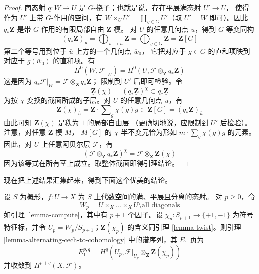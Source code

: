 \begin{proof}
商态射 $q : W \to U$ 是 $G$-挠子；也就是说，存在平展满态射 $U' \to U$，
使得作为 $U'$ 上带 $G$-作用的空间，有
$W \times_U U' = \coprod_{g \in G} U'$（取 $U' = W$ 即可）。因此
$q_*\underline{\mathbf{Z}}$ 是带 $G$-作用的有限局部自由 $\mathbf{Z}$-模。
对 $U$ 的任意几何点 $\overline{u}$，得到 $G$-等变同构
$$
(q_*\underline{\mathbf{Z}})_{\overline{u}}
= \bigoplus\nolimits_{\overline{w} \mapsto \overline{u}} \mathbf{Z}
= \bigoplus\nolimits_{g \in G} \mathbf{Z} = \mathbf{Z}[G]
$$
第二个等号用到位于 $\overline{u}$ 上方的一个几何点 $\overline{w}_0$，
它把对应于 $g \in G$ 的直和项映到对应于 $g(\overline{w}_0)$ 的直和项。有
$$
H^0(W, \mathcal{F}|_W) =
H^0(U, \mathcal{F} \otimes_\mathbf{Z} q_*\underline{\mathbf{Z}})
$$
这是因为
$q_*\mathcal{F}|_W = \mathcal{F} \otimes_\mathbf{Z} q_*\underline{\mathbf{Z}}$；
限制到 $U'$ 后即可检验。令
$$
\underline{\mathbf{Z}}(\chi) =
(q_*\underline{\mathbf{Z}})^\chi \subset
q_*\underline{\mathbf{Z}}
$$
为按 $\chi$ 变换的截面所成的子层。对 $U$ 的任意几何点 $\overline{u}$，有
$$
\underline{\mathbf{Z}}(\chi)_{\overline{u}} =
\mathbf{Z} \cdot \sum\nolimits_g \chi(g) g
\subset
\mathbf{Z}[G] = (q_*\underline{\mathbf{Z}})_{\overline{u}}
$$
由此可知 $\underline{\mathbf{Z}}(\chi)$ 是秩为 $1$ 的局部自由层
（更确切地说，应限制到 $U'$ 后检验）。注意，对任意 $\mathbf{Z}$-模 $M$，
$M[G]$ 的 $\chi$-半不变元恰为形如
$m \cdot \sum\nolimits_g \chi(g) g$ 的元素。因此，对 $U$ 上任意阿贝尔层
$\mathcal{F}$，有
$$
\left(\mathcal{F} \otimes_\mathbf{Z} q_*\underline{\mathbf{Z}}\right)^\chi
=
\mathcal{F} \otimes_\mathbf{Z} \underline{\mathbf{Z}}(\chi)
$$
因为该等式在所有茎上成立。取整体截面即得引理结论。
\end{proof}

\noindent
现在把上述结果汇集起来，得到下面这个优美的结论。

\begin{lemma}
\label{lemma-alternating-spectral-sequence}
设 $S$ 为概形，$f : U \to X$ 为 $S$ 上代数空间的满、平展且分离的态射。
对 $p \geq 0$，令
$$
W_p = U \times_X \ldots \times_X U \setminus \text{all diagonals}
$$
如引理 \ref{lemma-compute}，其中有 $p + 1$ 个因子。设
$\chi_p : S_{p + 1} \to \{+1, -1\}$ 为符号特征标，并令
$U_p = W_p/S_{p + 1}$；$\underline{\mathbf{Z}}(\chi_p)$ 的含义同引理
\ref{lemma-twist}。则引理 \ref{lemma-alternating-cech-to-cohomology}
中的谱序列，其 $E_1$ 页为
$$
E_1^{p, q} =
H^q(U_p, \mathcal{F}|_{U_p} \otimes_\mathbf{Z} \underline{\mathbf{Z}}(\chi_p))
$$
并收敛到 $H^{p + q}(X, \mathcal{F})$。
\end{lemma}


